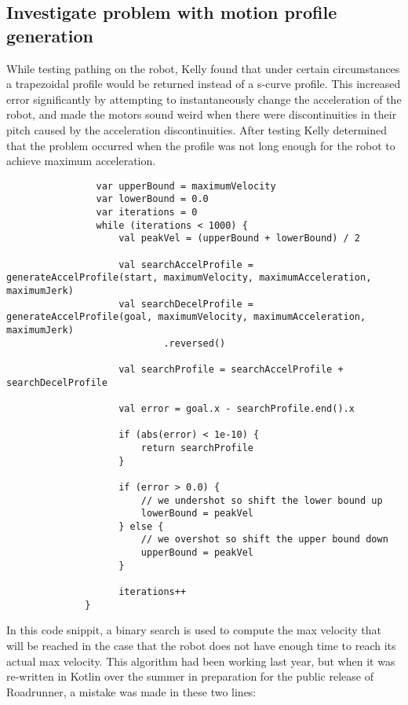 \documentclass{article}
\newif\ifcontents
\begin{document}
\contentsfalse

\subsection{Investigate problem with motion profile generation}
While testing pathing on the robot, Kelly found that under certain circumstances a trapezoidal profile would be returned instead of a s-curve profile. This increased error significantly by attempting to instantaneously change the acceleration of the robot, and made the motors sound weird when there were discontinuities in their pitch caused by the acceleration discontinuities. After testing Kelly determined that the problem occurred when the profile was not long enough for the robot to achieve maximum acceleration. 


\begin{lstlisting}
                var upperBound = maximumVelocity
                var lowerBound = 0.0
                var iterations = 0
                while (iterations < 1000) {
                    val peakVel = (upperBound + lowerBound) / 2

                    val searchAccelProfile = generateAccelProfile(start, maximumVelocity, maximumAcceleration, maximumJerk)
                    val searchDecelProfile = generateAccelProfile(goal, maximumVelocity, maximumAcceleration, maximumJerk)
                            .reversed()

                    val searchProfile = searchAccelProfile + searchDecelProfile

                    val error = goal.x - searchProfile.end().x

                    if (abs(error) < 1e-10) {
                        return searchProfile
                    }

                    if (error > 0.0) {
                        // we undershot so shift the lower bound up
                        lowerBound = peakVel
                    } else {
                        // we overshot so shift the upper bound down
                        upperBound = peakVel
                    }

                    iterations++
              }

\end{lstlisting}

In this code snippit, a binary search is used to compute the max velocity that will be reached in the case that the robot does not have enough time to reach its actual max velocity. This algorithm had been working last year, but when it was re-written in Kotlin over the summer in preparation for the public release of Roadrunner, a mistake was made in these two lines:
\end{document}
